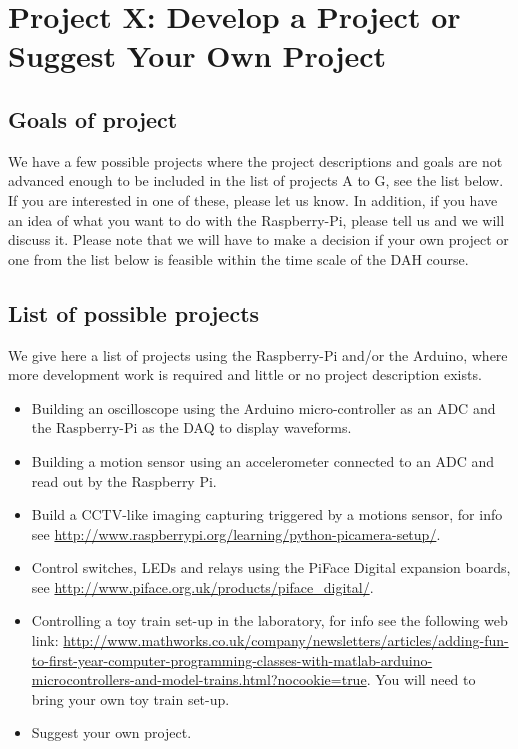 

\newpage
\section{Project X: Develop a Project or Suggest Your Own Project}

\subsection{Goals of project}

We have a few possible projects where the project descriptions and goals are not advanced enough to be included in the list of projects A to G, see the list below. If you are interested in one of these, please let us know. In addition, if you have an idea of what you want to do with the Raspberry-Pi, please tell us and we will discuss it. Please note that we will have to make a decision if your own project or one from the list below is feasible within the time scale of the DAH course.


\subsection{List of possible projects}

We give here a list of projects using the Raspberry-Pi and/or the Arduino, where more development work is required and little or no project description exists. 

\begin{itemize}
\item Building an oscilloscope using the Arduino micro-controller as an ADC and the Raspberry-Pi as the DAQ to display waveforms.
\item Building a motion sensor using an accelerometer connected to an ADC and read out by the Raspberry Pi.
\item Build a CCTV-like imaging capturing triggered by a motions sensor, for info see 
\url{http://www.raspberrypi.org/learning/python-picamera-setup/}.
\item Control switches, LEDs and relays using the PiFace Digital expansion boards, see 
\url{http://www.piface.org.uk/products/piface_digital/}.
\item Controlling a toy train set-up in the laboratory, for info see the following web link: 
\url{http://www.mathworks.co.uk/company/newsletters/articles/adding-fun-to-first-year-computer-programming-classes-with-matlab-arduino-microcontrollers-and-model-trains.html?nocookie=true}.
You will need to bring your own toy train set-up.
\item Suggest your own project.
\end{itemize}

